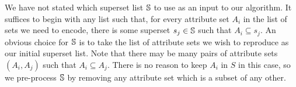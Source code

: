 We have not stated which superset list $\mathbb{S}$ to use as an input to our algorithm. It suffices to begin with any list such that, for every attribute set $A_i$ in the list of sets we need to encode, there is some superset $s_j \in \mathbb{S}$ such that $A_i \subseteq s_j$. An obvious choice for $\mathbb{S}$ is to take the list of attribute sets we wish to reproduce as our initial superset list. Note that there may be many pairs of attribute sets $(A_i, A_j)$ such that $A_i \subseteq A_j$. There is no reason to keep $A_i$ in $S$ in this case, so we pre-process $\mathbb{S}$ by removing any attribute set which is a subset of any other. 


